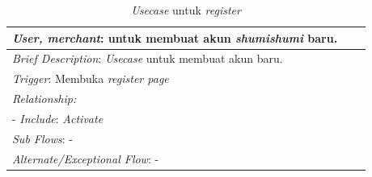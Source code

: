 \documentclass[a4paper]{article}
\begin{document}
\begin{enumerate}
\begin{enumerate}
\begin{table}[h]
\begin{tabular}{|lll}
            \multicolumn{1}{|l|}{\textit{User, merchant}: untuk membuat akun \textit{shumishumi} baru. }                                                     &                               &                               \\ \hline
            \multicolumn{3}{|l|}{\textit{Brief Description}: \textit{Usecase} untuk membuat akun baru.}                                                                         \\ \hline
            \multicolumn{3}{|l|}{\textit{Trigger}: Membuka\textit{ register page}}                                                                                   \\ \hline
            \multicolumn{3}{|l|}{\textit{Relationship:}}                                                                              \\ \hline
            \multicolumn{3}{|l|}{- \textit{Include}: \textit{Activate}}                                                                                                                     \\ \hline
            \multicolumn{3}{|l|}{\textit{Sub Flows}: -}                                                                                 \\ \hline
            \multicolumn{3}{|l|}{\textit{Alternate/Exceptional Flow}: -}                                                                \\ \hline
            \end{tabular}
            \caption{\textit{Usecase} untuk \textit{register}}
        \end{table}


\end{enumerate}
\end{enumerate}
\end{document}
